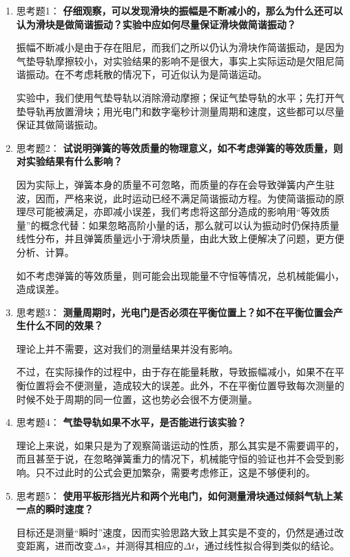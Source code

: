 \documentclass[11pt]{article}
\begin{document}
\begin{enumerate}
    \item 思考题1：  \textbf{仔细观察，可以发现滑块的振幅是不断减小的，那么为什么还可以认为滑块是做简谐振动？实验中应如何尽量保证滑块做简谐振动？}

振幅不断减小是由于存在阻尼，而我们之所以仍认为滑块作简谐振动，是因为气垫导轨摩擦较小，对实验结果的影响不是很大，事实上实际运动是欠阻尼简谐振动。在不考虑耗散的情况下，可近似认为是简谐运动。

实验中，我们使用气垫导轨以消除滑动摩擦；保证气垫导轨的水平；先打开气垫导轨再放置滑块；用光电门和数字毫秒计测量周期和速度，这些都可以尽量保证其做简谐振动。

    \item 思考题2：  \textbf{试说明弹簧的等效质量的物理意义，如不考虑弹簧的等效质量，则对实验结果有什么影响？}

因为实际上，弹簧本身的质量不可忽略，而质量的存在会导致弹簧内产生驻波，因而，严格来说，此时运动已经不满足简谐振动方程。为使简谐振动的原理尽可能被满足，亦即减小误差，我们考虑将这部分造成的影响用“等效质量”的概念代替：如果忽略高阶小量的话，那么就可以认为振动时仍保持质量线性分布，并且弹簧质量远小于滑块质量，由此大致上便解决了问题，更方便分析、计算。

如不考虑弹簧的等效质量，则可能会出现能量不守恒等情况，总机械能偏小，造成误差。

    \item 思考题3：  \textbf{测量周期时，光电门是否必须在平衡位置上？如不在平衡位置会产生什么不同的效果？}

理论上并不需要，这对我们的测量结果并没有影响。

不过，在实际操作的过程中，由于存在能量耗散，导致振幅减小，如果不在平衡位置将会不便测量，造成较大的误差。此外，不在平衡位置导致每次测量的时候不处于周期的同一位置，这也势必会很不方便测量。

    \item 思考题4：  \textbf{气垫导轨如果不水平，是否能进行该实验？}


理论上来说，如果只是为了观察简谐运动的性质，那么其实是不需要调平的，而且甚至于说，在忽略弹簧重力的情况下，机械能守恒的验证也并不会受到影响。只不过此时的公式会更加繁杂，需要考虑修正，这是不够便利的。

    \item 思考题5：  \textbf{使用平板形挡光片和两个光电门，如何测量滑块通过倾斜气轨上某一点的瞬时速度？}

目标还是测量“瞬时”速度，因而实验思路大致上其实是不变的，仍然是通过改变距离，进而改变$\Delta s$，并测得其相应的$\Delta t$，通过线性拟合得到类似的结论。


\end{enumerate}
\end{document}
